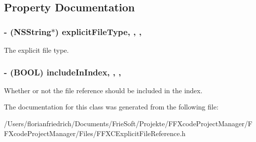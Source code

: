\subsection{Property Documentation}
\hypertarget{interface_f_f_x_c_explicit_file_reference_a39a3c9da667a30b338325ff8926965dc}{
\subsubsection[{explicit\-File\-Type}]{\setlength{\rightskip}{0pt plus 5cm}-\/ (N\-S\-String$\ast$) explicit\-File\-Type\hspace{0.3cm}{\ttfamily [read]}, {\ttfamily [write]}, {\ttfamily [nonatomic]}, {\ttfamily [strong]}}}\label{interface_f_f_x_c_explicit_file_reference_a39a3c9da667a30b338325ff8926965dc}
The explicit file type. \hypertarget{interface_f_f_x_c_explicit_file_reference_ac032c5431013dca9e176ff977673287b}{
\subsubsection[{include\-In\-Index}]{\setlength{\rightskip}{0pt plus 5cm}-\/ (B\-O\-O\-L) include\-In\-Index\hspace{0.3cm}{\ttfamily [read]}, {\ttfamily [write]}, {\ttfamily [nonatomic]}, {\ttfamily [assign]}}}\label{interface_f_f_x_c_explicit_file_reference_ac032c5431013dca9e176ff977673287b}
Whether or not the file reference should be included in the index. 

The documentation for this class was generated from the following file\-:\begin{DoxyCompactItemize}
\item 
/\-Users/florianfriedrich/\-Documents/\-Frie\-Soft/\-Projekte/\-F\-F\-Xcode\-Project\-Manager/\-F\-F\-Xcode\-Project\-Manager/\-Files/F\-F\-X\-C\-Explicit\-File\-Reference.\-h\end{DoxyCompactItemize}
